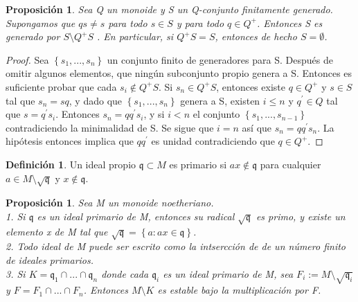 \documentclass[12pt,spanish]{amsart}
\newcommand{\fk}[1]{\mathfrak{#1}}
\newcommand{\set}[1]{\left\{{#1}\right\}}
\newtheorem{prop}[Theorem]{Proposición}
\theoremstyle{definition}
\newtheorem{Def}[Theorem]{Definición}
\theoremstyle{remark}
\begin{document}
\begin{prop}
Sea Q un monoide y S un Q-conjunto finitamente generado. Supongamos que $qs \neq s$ para todo $s\in S$ y para todo $q\in Q^{+}$. Entonces S es generado por $S \setminus Q^{+}S$ . En particular, si $Q^{+}S=S$, entonces de hecho $S=\emptyset$. 
\end{prop}

\begin{proof}
Sea $\set{s_{1},...,s_{n}}$ un conjunto finito de generadores para S. Después de omitir algunos elementos, que ningún subconjunto propio genera a S. Entonces es suficiente probar que cada $s_{i}\notin Q^{+}S$. Si $s_{n}\in Q^{+}S$, entonces existe $q\in Q^{+}$ y $s\in S$ tal que $s_{n}=sq$, y dado que $\set{s_{1},...,s_{n}}$ genera a S, existen $i\leq n$ y $q^{\prime}\in Q$ tal que $s=q^{\prime}s_{i}$. Entonces $s_{n}=qq^{\prime}s_{i}$, y si $i<n$ el conjunto $\set{s_{1},...,s_{n-1}}$ contradiciendo la minimalidad de S. Se sigue que $i=n$ así que $s_{n}=qq^{\prime}s_{n}$. La hipótesis entonces implica que $qq^{\prime}$ es unidad contradiciendo que $q\in Q^{+}$.  
\end{proof}

\begin{Def}
Un ideal propio $\fk{q} \subset M$ es primario si $ax\notin \fk{q}$ para cualquier $a\in M\setminus \sqrt{\fk{q}}$ y $x\notin \fk{q}$.  
\end{Def}

\begin{prop}
Sea M un monoide noetheriano. \\
1. Si $\fk{q}$ es un ideal primario de M, entonces su radical $\sqrt{\fk{q}}$ es primo, y existe un elemento x de M tal que $\sqrt{\fk{q}}=\set{a:ax\in \fk{q}}$. \\ 
2. Todo ideal de M puede ser escrito como la intsercción de de un número finito de ideales primarios. \\ 
3. Si $K=\fk{q}_{1} \cap ... \cap \fk{q}_{n}$ donde cada $\fk{q}_{i}$ es un ideal primario de M, sea $F_{i}:=M \setminus \sqrt{\fk{q}_{i}}$ y $F=F_{1} \cap ... \cap F_{n}$. Entonces $M\setminus K$ es estable bajo la multiplicación por F. 
\end{prop}
\end{document}

